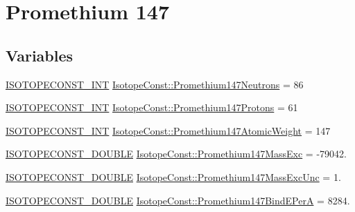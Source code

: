 \hypertarget{group___isotope_const-_promethium-_pm147}{}\section{Promethium 147}
\label{group___isotope_const-_promethium-_pm147}
\subsection*{Variables}
\begin{DoxyCompactItemize}
\item 
\mbox{\hyperlink{group___isotope_const-_macros_ga5f18360b3e99483a35c32d789e62621c}{I\+S\+O\+T\+O\+P\+E\+C\+O\+N\+S\+T\+\_\+\+I\+NT}} \mbox{\hyperlink{group___isotope_const-_promethium-_pm147_ga577f1bfdcf3118f2f92a69840d581455}{Isotope\+Const\+::\+Promethium147\+Neutrons}} = 86
\item 
\mbox{\hyperlink{group___isotope_const-_macros_ga5f18360b3e99483a35c32d789e62621c}{I\+S\+O\+T\+O\+P\+E\+C\+O\+N\+S\+T\+\_\+\+I\+NT}} \mbox{\hyperlink{group___isotope_const-_promethium-_pm147_ga7069931be025c5ba3787bf8bbf1948e0}{Isotope\+Const\+::\+Promethium147\+Protons}} = 61
\item 
\mbox{\hyperlink{group___isotope_const-_macros_ga5f18360b3e99483a35c32d789e62621c}{I\+S\+O\+T\+O\+P\+E\+C\+O\+N\+S\+T\+\_\+\+I\+NT}} \mbox{\hyperlink{group___isotope_const-_promethium-_pm147_ga0626b3388b7e7685f3935584fd73dec8}{Isotope\+Const\+::\+Promethium147\+Atomic\+Weight}} = 147
\item 
\mbox{\hyperlink{group___isotope_const-_macros_ga8f45a7272ce02c0b4c65c44636ed719a}{I\+S\+O\+T\+O\+P\+E\+C\+O\+N\+S\+T\+\_\+\+D\+O\+U\+B\+LE}} \mbox{\hyperlink{group___isotope_const-_promethium-_pm147_gaee73879f316f45219acd93988c3129dd}{Isotope\+Const\+::\+Promethium147\+Mass\+Exc}} = -\/79042.
\item 
\mbox{\hyperlink{group___isotope_const-_macros_ga8f45a7272ce02c0b4c65c44636ed719a}{I\+S\+O\+T\+O\+P\+E\+C\+O\+N\+S\+T\+\_\+\+D\+O\+U\+B\+LE}} \mbox{\hyperlink{group___isotope_const-_promethium-_pm147_gaecf278f049db05f8abd47b911e67454f}{Isotope\+Const\+::\+Promethium147\+Mass\+Exc\+Unc}} = 1.
\item 
\mbox{\hyperlink{group___isotope_const-_macros_ga8f45a7272ce02c0b4c65c44636ed719a}{I\+S\+O\+T\+O\+P\+E\+C\+O\+N\+S\+T\+\_\+\+D\+O\+U\+B\+LE}} \mbox{\hyperlink{group___isotope_const-_promethium-_pm147_ga5ec0cb77345456471e1ad53617a5b2e5}{Isotope\+Const\+::\+Promethium147\+Bind\+E\+PerA}} = 8284.
\item 

\end{DoxyCompactItemize}
